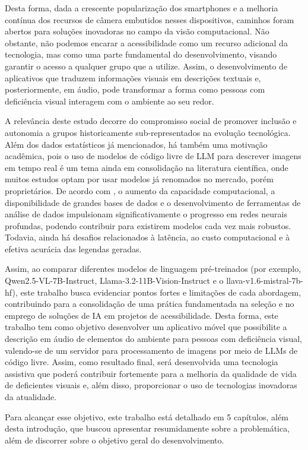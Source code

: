 Desta forma, dada a crescente popularização dos smartphones e a melhoria contínua dos recursos de câmera embutidos nesses dispositivos, caminhos foram abertos para soluções inovadoras no campo da visão computacional. Não obstante, não podemos encarar a acessibilidade como um recurso adicional da tecnologia, mas como uma parte fundamental do desenvolvimento, visando garantir o acesso a qualquer grupo que a utilize. Assim, o desenvolvimento de aplicativos que traduzem informações visuais em descrições textuais e, posteriormente, em áudio, pode transformar a forma como pessoas com deficiência visual interagem com o ambiente ao seu redor.

A relevância deste estudo decorre do compromisso social de promover inclusão e autonomia a grupos historicamente sub-representados na evolução tecnológica. Além dos dados estatísticos já mencionados, há também uma motivação acadêmica, pois o uso de modelos de código livre de LLM para descrever imagens em tempo real é um tema ainda em consolidação na literatura científica, onde muitos estudos optam por usar modelos já renomados no mercado, porém proprietários. De acordo com , o aumento da capacidade computacional, a disponibilidade de grandes bases de dados e o desenvolvimento de ferramentas de análise de dados impulsionam significativamente o progresso em redes neurais profundas, podendo contribuir para existirem modelos cada vez mais robustos. Todavia, ainda há desafios relacionados à latência, ao custo computacional e à efetiva acurácia das legendas geradas.

Assim, ao comparar diferentes modelos de linguagem pré-treinados (por exemplo, Qwen2.5-VL-7B-Instruct, Llama-3.2-11B-Vision-Instruct e o llava-v1.6-mistral-7b-hf), este trabalho busca evidenciar pontos fortes e limitações de cada abordagem, contribuindo para a consolidação de uma prática fundamentada na seleção e no emprego de soluções de IA em projetos de acessibilidade. Desta forma, este trabalho tem como objetivo desenvolver um aplicativo móvel que possibilite a descrição em áudio de elementos do ambiente para pessoas com deficiência visual, valendo-se de um servidor para processamento de imagens por meio de LLMs de código livre. Assim, como resultado final, será desenvolvida uma tecnologia assistiva que poderá contribuir fortemente para a melhoria da qualidade de vida de deficientes visuais e, além disso, proporcionar o uso de tecnologias inovadoras da atualidade.

Para alcançar esse objetivo, este trabalho está detalhado em 5 capítulos, além desta introdução, que buscou apresentar resumidamente sobre a problemática, além de discorrer sobre o objetivo geral do desenvolvimento.

